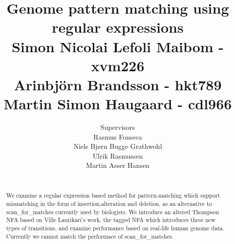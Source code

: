 \documentclass{article}
\author{
\huge{Supervisors}\\
\Large{Rasmus Fonseca}\\
\Large{Niels Bjørn Bugge Grathwohl}\\
\Large{Ulrik Rasmussen}\\
\Large{Martin Asser Hansen}\\
    \\ \texttt{}
}
\title{
  \vspace{3cm}
  \Huge{Genome pattern matching using regular expressions} \\
  \Large{Simon Nicolai Lefoli Maibom - xvm226} \\
  \Large{Arinbjörn Brandsson - hkt789}\\
  \Large{Martin Simon Haugaard - cdl966}
}
\begin{document}


\clearpage\maketitle
\thispagestyle{empty}

\newpage
\begin{abstract}
We examine a regular expression based method for pattern-matching which support mismatching in the form of insertion,alteration and deletion, as an alternative to scan\_for\_matches currently used by biologists. We introduce an altered Thompson NFA based on Ville Laurikari's work, the tagged NFA which introduces three new types of transitions, and examine performance based on real-life human genome data. Currently we cannot match the performace of scan\_for\_matches.
\end{abstract}
\newpage
\tableofcontents
 
\newpage


















\end{document}
